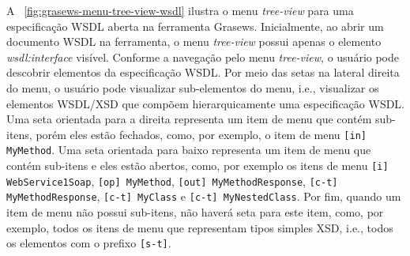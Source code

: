 A \figurename~\ref{fig:grasews-menu-tree-view-wsdl} ilustra o menu \textit{tree-view} para uma especificação WSDL aberta na ferramenta Grasews. Inicialmente, ao abrir um documento WSDL na ferramenta, o menu \textit{tree-view} possui apenas o elemento \textit{wsdl:interface} visível. Conforme a navegação pelo menu \textit{tree-view}, o usuário pode descobrir elementos da especificação WSDL. Por meio das setas na lateral direita do menu, o usuário pode visualizar sub-elementos do menu, i.e., visualizar os elementos WSDL/XSD que compõem hierarquicamente uma especificação WSDL.  Uma seta orientada para a direita representa um item de menu que contém sub-itens, porém eles estão fechados, como, por exemplo, o item de menu \texttt{[in] MyMethod}. Uma seta orientada para baixo representa um item de menu que contém sub-itens e eles estão abertos, como, por exemplo os itens de menu \texttt{[i] WebService1Soap}, \texttt{[op] MyMethod}, \texttt{[out] MyMethodResponse}, \texttt{[c-t] MyMethodResponse}, \texttt{[c-t] MyClass} e \texttt{[c-t] MyNestedClass}. Por fim, quando um item de menu não possui sub-itens, não haverá seta para este item, como, por exemplo, todos os itens de menu que representam tipos simples XSD, i.e., todos os elementos com o prefixo \texttt{[s-t]}.

